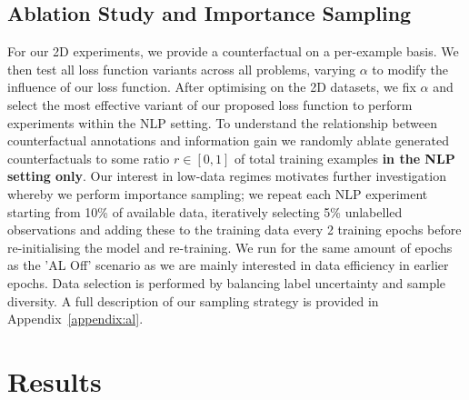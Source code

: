 % 

\subsection{Ablation Study and Importance Sampling}
For our 2D experiments, we provide a counterfactual on a per-example basis. We then test all loss function variants across all problems, varying $\alpha$ to modify the influence of our loss function. After optimising on the 2D datasets, we fix $\alpha$ and select the most effective variant of our proposed loss function to perform experiments within the NLP setting. To understand the relationship between counterfactual annotations and information gain we randomly ablate generated counterfactuals to some ratio $r \in [0,1]$ of total training examples \textbf{in the NLP setting only}. Our interest in low-data regimes motivates further investigation whereby we perform importance sampling; we repeat each NLP experiment starting from 10\% of available data, iteratively selecting 5\% unlabelled observations and adding these to the training data every 2 training epochs before re-initialising the model and re-training. We run for the same amount of epochs as the 'AL Off' scenario as we are mainly interested in data efficiency in earlier epochs. Data selection is performed by balancing label uncertainty and sample diversity. A full description of our sampling strategy is provided in Appendix~\ref{appendix:al}.

\section{Results}
\label{sec:results}

